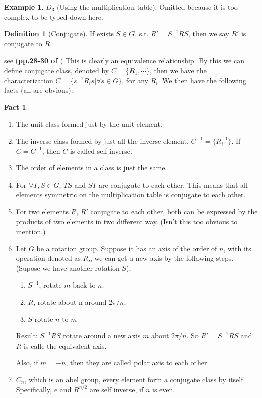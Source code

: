 \documentclass{article}
\numberwithin{equation}{subsection} %
\theoremstyle{definition}
\newtheorem{defi}{Definition}[section]
\newtheorem{ex}{Example}[section]
\newtheorem{fact}{Fact}[section]
\begin{document}
\begin{ex}
    $D_3$ (Using the multiplication table). Omitted because it is too
    complex to be typed down here.
\end{ex}

\begin{defi}[Conjugate]
    If exists $S\in G$, s.t. $R' = S^{-1}RS$, then we say $R'$ is
    conjugate to $R$.
\end{defi}
see (\textbf{pp.28-30 of \cite{book}})
This is clearly an equivalence relationship. By this we can define
conjugate class, denoted by $C=\{R_1,\cdots\}$, then we have the
characterization $C = \{ s^{-1} R_i s|\forall s\in G\}$, for any
$R_i$. We then have the following facts (all are obvious):
\begin{fact}$ $

    \begin{enumerate}
        \item The unit class formed just by the unit element.
        \item The inverse class formed by just all the inverse element.
            $C^{-1} = \{ R_i^{-1}\}$. If $C=C^{-1}$, then $C$ is called
            self-inverse.
        \item The order of elements in a class is just the same.
        \item For $\forall T,S\in G$, $TS$ and $ST$ are conjugate to each
            other. This means that all elements symmetric on the
            multiplication table is conjugate to each other.
        \item For two elements $R$, $R'$ conjugate to each other, both
            can be expressed by the products of two elements in two
            different way. (Isn't this too obvious to mention.)
        \item Let $G$ be a rotation group. Suppose it has an axis of the
            order of $n$, with its operation denoted as $R$,, we can get
            a new axis by the following steps. (Supose we have another
            rotation $S$),

            \begin{enumerate}
                \item  $S^{-1}$, rotate $m$ back to $n$.
                \item  $R$, rotate about n around $2\pi/n$,
                \item  $S$ rotate $n$ to $m$
            \end{enumerate}

            Result: $S^{-1}RS$ rotate around a new axis $m$ about
            $2\pi/n$. So $R'=S^{-1}RS$ and $R$ is calle the equivalent
            axis. 
            
            Also, if $m=-n$, then they are called polar axis to each
            other.

        \item $C_n$, which is an abel group, every element form a
            conjugate class by itself. Specifically, $e$ and $R^{n/2}$
            are self inverse, if $n$ is even.
    \end{enumerate}
\end{fact}
\end{document}
